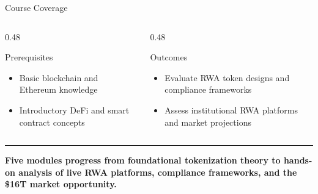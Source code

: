 \documentclass[8pt,aspectratio=169]{beamer}
\newcommand{\bottomnote}[1]{\vfill\vspace{-2mm}\textcolor{mllavender2}{\rule{\textwidth}{0.4pt}}\vspace{1mm}\footnotesize\textbf{#1}}
\begin{document}
\begin{frame}{Course Coverage}
\begin{center}
\end{center}
\vspace{4mm}
\begin{columns}[T]
\begin{column}{0.48\textwidth}
\begin{block}{Prerequisites}
\begin{itemize}\setlength\itemsep{2pt}
  \item[\small$\checkmark$] \small Basic blockchain and Ethereum knowledge
  \item[\small$\checkmark$] \small Introductory DeFi and smart contract concepts
\end{itemize}
\end{block}
\end{column}
\begin{column}{0.48\textwidth}
\begin{block}{Outcomes}
\begin{itemize}\setlength\itemsep{2pt}
  \item[\small$\checkmark$] \small Evaluate RWA token designs and compliance frameworks
  \item[\small$\checkmark$] \small Assess institutional RWA platforms and market projections
\end{itemize}
\end{block}
\end{column}
\end{columns}
\bottomnote{Five modules progress from foundational tokenization theory to hands-on analysis of live RWA platforms, compliance frameworks, and the \$16T market opportunity.}
\end{frame}
\end{document}
